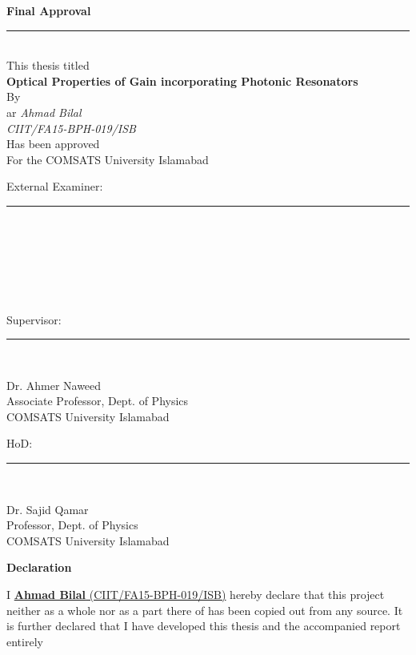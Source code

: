 \documentclass[12pt,twoside]{report}
\begin{document}
	\begin{center}
		\textbf{\Large{Final Approval}}
		\noindent\rule{15cm}{1pt} \\

		This thesis titled\\
		\vspace{0.5cm}
{\Large \textbf {Optical Properties of Gain incorporating Photonic Resonators}}\\
\vspace{0.3cm}
By\\ar
\emph{Ahmad Bilal}\\
\emph{CIIT/FA15-BPH-019/ISB}\\
\vspace{0.1 in}
Has been approved\\
\vspace{0.1 in}
For the COMSATS University Islamabad\\
\end{center}
\vspace{0.5cm}
External Examiner: \noindent\rule{8cm}{0.4pt}\\\\\\\\\\\\
Supervisor: \hspace{1.35cm}\noindent\rule{8cm}{0.4pt}\\
\begin{center}
	Dr. Ahmer Naweed\\
	Associate Professor, Dept. of Physics\\
	COMSATS University Islamabad\\
\end{center}
\vspace{0.5cm}
HoD: \hspace{2.5cm}\noindent\rule{8cm}{0.4pt}\\
\begin{center}
	Dr. Sajid Qamar\\
	Professor, Dept. of Physics\\
	COMSATS University Islamabad
\end{center}
	\newpage
	\begin{center}
		\textbf{\Large{Declaration}}
		\end{center}
I \underline{\textbf{Ahmad Bilal} (CIIT/FA15-BPH-019/ISB)} hereby declare that this project
neither as a whole nor as a part there of has been copied out from any source. It is
further declared that I have developed this thesis and the accompanied report entirely
\end{document}
